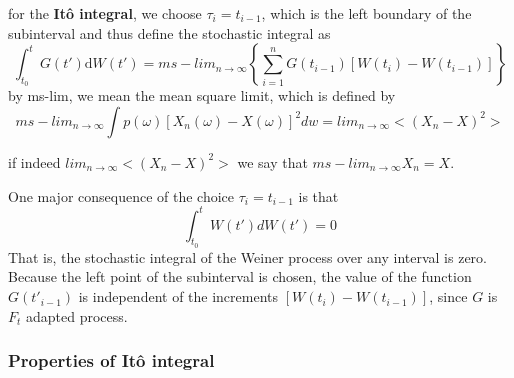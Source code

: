\documentclass[12pt]{report}
\begin{document}
for the \textbf{It\^{o} integral}, we choose $\tau_i=t_{i-1}$, which is the left boundary of the subinterval and thus define the stochastic integral as
\begin{equation*}
\int_{t_0}^{t}G(t')\mathrm{d}W(t')=ms-lim_{n\rightarrow\infty}\left\{\sum_{i=1}^nG(t_{i-1})[W(t_{i})-W(t_{i-1})] \right\}
\end{equation*}
by ms-lim, we mean the mean square limit, which is defined by 
\begin{equation*}
ms-lim_{n\rightarrow\infty}\int p(\omega)[X_n(\omega)-X(\omega)]^2dw= lim_{n\rightarrow \infty}<(X_n-X)^2>
\end{equation*}

if indeed $lim_{n\rightarrow \infty}<(X_n-X)^2>$ we say that $ms-lim_{n\rightarrow \infty} X_n=X$.

One major consequence of the choice $\tau_i=t_{i-1}$ is that 
\begin{equation*}
\int_{t_0}^{t}W(t')dW(t')=0
\end{equation*}
That is, the stochastic integral of the Weiner process over any interval is zero.
Because the left point of the subinterval is chosen, the value of the function $G(t'_{i-1})$ is independent of the increments $[W(t_i)-W(t_{i-1})]$, since $G$ is $F_t$ adapted process.
\subsubsection{Properties of It\^{o} integral}
\end{document}
